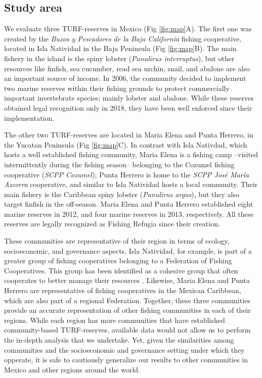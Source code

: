 \documentclass{frontiersSCNS}
\theoremstyle{definition}
\theoremstyle{definition}
\theoremstyle{definition}
\theoremstyle{remark}
\begin{document}
\subsection{Study area}\label{study-area}

We evaluate three TURF-reserves in Mexico (Fig \ref{fig:map}A). The
first one was created by the \emph{Buzos y Pescadores de la Baja
California} fishing cooperative, located in Isla Natividad in the Baja
Peninsula (Fig \ref{fig:map}B). The main fishery in the island is the
spiny lobster (\emph{Panulirus interruptus}), but other resources like
finfish, sea cucumber, read sea urchin, snail, and abalone are also an
important source of income. In 2006, the community decided to implement
two marine reserves within their fishing grounds to protect commercially
important invertebrate species; mainly lobster and abalone. While these
reserves obtained legal recognition only in 2018, they have been well
enforced since their implementation.

The other two TURF-reserves are located in Maria Elena and Punta
Herrero, in the Yucatan Peninsula (Fig \ref{fig:map}C). In contrast with
Isla Nativdad, which hosts a well established fishing community, Maria
Elena is a fishing camp --visited intermittently during the fishing
season-- belonging to the Cozumel fishing cooperative (\emph{SCPP
Cozumel}); Punta Herrero is home to the \emph{SCPP José María Azcorra}
cooperative, and similar to Isla Natividad hosts a local community.
Their main fishery is the Caribbean spiny lobster (\emph{Panulirus
argus}), but they also target finfish in the off-season. Maria Elena and
Punta Herrero established eight marine reserves in 2012, and four marine
reserves in 2013, respectively. All these reserves are legally
recognized as Fishing Refugia since their creation.

These communities are representative of their region in terms of
ecology, socioeconomic, and governance aspects. Isla Natividad, for
example, is part of a greater group of fishing cooperatives belonging to
a Federation of Fishing Cooperatives. This group has been identified as
a cohesive group that often cooperates to better manage their resources
\citep{mccay_2017-1m,mccay_2014-CN,acevesbueno_2017}. Likewise, Maria
Elena and Punta Herrero are representative of fishing cooperatives in
the Mexican Caribbean, which are also part of a regional Federation.
Together, these three communities provide an accurate representation of
other fishing communities in each of their regions. While each region
has more communities that have established community-based
TURF-reserves, available data would not allow us to perform the in-depth
analysis that we undertake. Yet, given the similarities among
communities and the socioeconomic and governance setting under which
they opperate, it is safe to cautiously generalize our results to other
communities in Mexico and other regions around the world.
\end{document}
